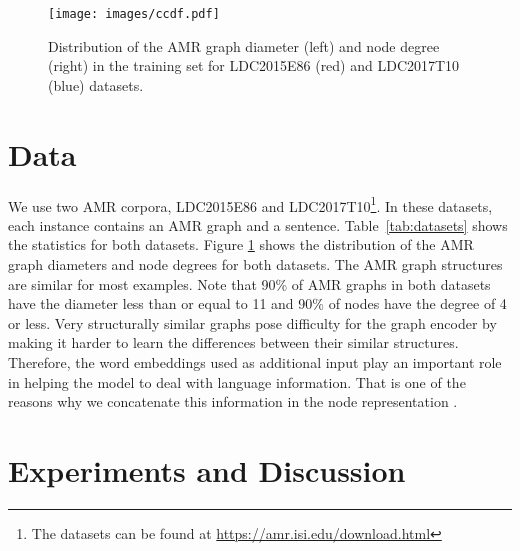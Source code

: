 \documentclass[11pt,a4paper]{article}
\newcommand\ftnote[1]{\footnote{\raggedright#1}}
\begin{document}
 \begin{figure}
    \centering
    \texttt{[image: images/ccdf.pdf]}
    \caption{Distribution of the AMR graph diameter (left) and node degree (right) in the training set for LDC2015E86 (red) and LDC2017T10 (blue) datasets.}
    \label{fig:distdataset}
\end{figure}

\section{Data}

We use two AMR corpora, LDC2015E86 and LDC2017T10\ftnote{The datasets can be found at \href{https://amr.isi.edu/download.html}{https://amr.isi.edu/download.html}}. In these datasets, each instance contains an AMR graph and a sentence. Table~\ref{tab:datasets} shows the statistics for both datasets. Figure \ref{fig:distdataset} shows the distribution of the AMR graph diameters and node degrees for both datasets. The AMR graph structures are similar for most examples. Note that 90\% of AMR graphs in both datasets have the diameter less than or equal to 11 and 90\% of nodes have the degree of 4 or less. Very structurally similar graphs pose difficulty for the graph encoder by making it harder to learn the differences between their similar structures. Therefore, the word embeddings used as additional input play an important role in helping the model to deal with language information. That is one of the reasons why we concatenate this information in the node representation . 

\section{Experiments and Discussion}
\end{document}
